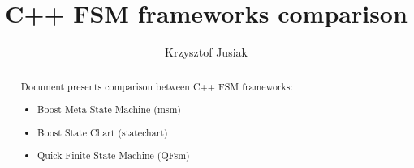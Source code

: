\documentclass[12pt]{report}
\begin{document}
\author{Krzysztof Jusiak}
\title{C++ FSM frameworks comparison}
\frenchspacing
\maketitle

\begin{abstract}
Document presents comparison between C++ FSM frameworks:
\begin{itemize}
\item Boost Meta State Machine (msm)
\item Boost State Chart (statechart)
\item Quick Finite State Machine (QFsm)
\end{itemize}
\end{abstract}

\clearpage
\tableofcontents











\clearpage
\listoffigures
\listoftables
\end{document}
